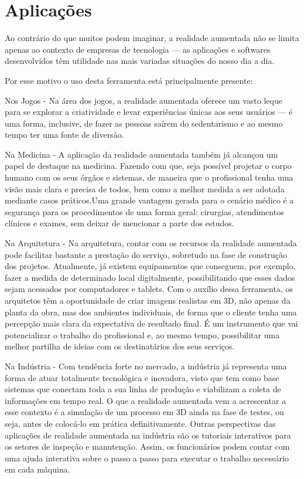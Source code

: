 \documentclass{report}
\begin{document}
\section{Aplicações}
Ao contrário do que muitos podem imaginar, a realidade aumentada não se limita apenas ao contexto de empresas de tecnologia — as aplicações e softwares desenvolvidos têm utilidade nas mais variadas situações do nosso dia a dia.

Por esse motivo o uso desta ferramenta está principalmente presente:

Nos Jogos - Na área dos jogos, a realidade aumentada oferece um vasto leque para se explorar a criatividade e levar experiências únicas aos seus usuários — é uma forma, inclusive, de fazer as pessoas saírem do sedentarismo e ao mesmo tempo ter uma fonte de diversão.

Na Medicina - A aplicação da realidade aumentada também já alcançou um papel de destaque na medicina. Fazendo com que, seja possível projetar o corpo humano com os seus órgãos e sistemas, de maneira que o profissional tenha uma visão mais clara e precisa de todos, bem como a melhor medida a ser adotada mediante casos práticos.Uma grande vantagem gerada para o cenário médico é a segurança para os procedimentos de uma forma geral: cirurgias, atendimentos clínicos e exames, sem deixar de mencionar a parte dos estudos.

Na Arquitetura - Na arquitetura, contar com os recursos da realidade aumentada pode facilitar bastante a prestação do serviço, sobretudo na fase de construção dos projetos. Atualmente, já existem equipamentos que conseguem, por exemplo, fazer a medida de determinado local digitalmente, possibilitando que esses dados sejam acessados por computadores e tablets. Com o auxílio dessa ferramenta, os arquitetos têm a oportunidade de criar imagens realistas em 3D,  não apenas da planta da obra, mas dos ambientes individuais, de forma que o cliente tenha uma percepção mais clara da expectativa de resultado final. É um instrumento que vai potencializar o trabalho do profissional e, ao mesmo tempo, possibilitar uma melhor partilha de ideias com os destinatários dos seus serviços.

Na Indústria - Com tendência forte no mercado, a indústria já representa uma forma de atuar totalmente tecnológica e inovadora, visto que tem como base sistemas que conectam toda a sua linha de produção e viabilizam a coleta de informações em tempo real. O que a realidade aumentada vem a acrescentar a esse contexto é a simulação de um processo em 3D ainda na fase de testes, ou seja, antes de colocá-lo em prática definitivamente. Outras perspectivas das aplicações de realidade aumentada na indústria são os tutoriais interativos para os setores de inspeção e manutenção. Assim, os funcionários podem contar com uma ajuda interativa sobre o passo a passo para executar o trabalho necessário em cada máquina.
\end{document}
